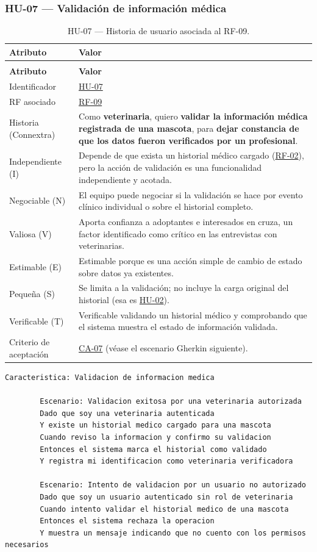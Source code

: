 \documentclass[journal,onecolumn]{IEEEtran}
\makeatletter
\newenvironment{atributos}[2]{%
	\small
	\begin{longtable}{@{}>{\raggedright\arraybackslash}p{4.2cm} >{\raggedright\arraybackslash}p{11.2cm}@{}}
		\caption{#2}\label{tab:#1}\\
		\toprule
		\textbf{Atributo} & \textbf{Valor} \\
		\midrule
		\endfirsthead
		\multicolumn{2}{@{}l}{\small\itshape (continuación)}\\
		\toprule
		\textbf{Atributo} & \textbf{Valor} \\
		\midrule
		\endhead
		\bottomrule
		\endlastfoot
	}{%
	\end{longtable}
	\normalsize
}
\makeatother
\begin{document}
	\subsubsection{HU-07 --- Validación de información médica}
	
	\begin{atributos}{HU-07}{HU-07 --- Historia de usuario asociada al RF-09.}
		Identificador & \hyperref[tab:HU-07]{HU-07} \\
		RF asociado & \hyperref[tab:RF-09]{RF-09} \\
		Historia (Connextra) & Como \textbf{veterinaria}, quiero \textbf{validar la información médica registrada de una mascota}, para \textbf{dejar constancia de que los datos fueron verificados por un profesional}. \\
		Independiente (I) & Depende de que exista un historial médico cargado (\hyperref[tab:RF-02]{RF-02}), pero la acción de validación es una funcionalidad independiente y acotada. \\
		Negociable (N) & El equipo puede negociar si la validación se hace por evento clínico individual o sobre el historial completo. \\
		Valiosa (V) & Aporta confianza a adoptantes e interesados en cruza, un factor identificado como crítico en las entrevistas con veterinarias. \\
		Estimable (E) & Estimable porque es una acción simple de cambio de estado sobre datos ya existentes. \\
		Pequeña (S) & Se limita a la validación; no incluye la carga original del historial (esa es \hyperref[tab:HU-02]{HU-02}). \\
		Verificable (T) & Verificable validando un historial médico y comprobando que el sistema muestra el estado de información validada. \\
		Criterio de aceptación & \hyperref[lst:ca07]{CA-07} (véase el escenario Gherkin siguiente). \\
	\end{atributos}
	
	\begin{lstlisting}[style=gherkin,caption={CA-07 --- Escenario de aceptación de la historia HU-07.},label={lst:ca07}]
		Caracteristica: Validacion de informacion medica
		
		Escenario: Validacion exitosa por una veterinaria autorizada
		Dado que soy una veterinaria autenticada
		Y existe un historial medico cargado para una mascota
		Cuando reviso la informacion y confirmo su validacion
		Entonces el sistema marca el historial como validado
		Y registra mi identificacion como veterinaria verificadora
		
		Escenario: Intento de validacion por un usuario no autorizado
		Dado que soy un usuario autenticado sin rol de veterinaria
		Cuando intento validar el historial medico de una mascota
		Entonces el sistema rechaza la operacion
		Y muestra un mensaje indicando que no cuento con los permisos necesarios
	\end{lstlisting}
	
\end{document}
